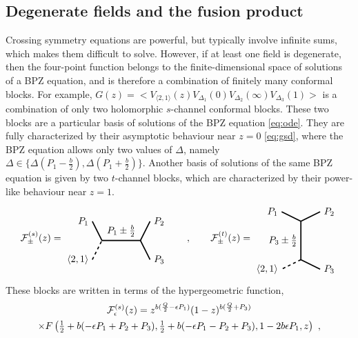 \documentclass[12pt, a4paper]{article}
\theoremstyle{break}
\begin{document}
\subsection{Degenerate fields and the fusion product}\label{sec:dffp}

Crossing symmetry equations are powerful, but typically involve infinite sums, which makes them difficult to solve.
However, if at least one field is degenerate, then the four-point function belongs to the finite-dimensional space of solutions of a BPZ equation, and is therefore a combination of finitely many conformal blocks. 
For example,
$G(z)=\Big< V_{\langle 2, 1 \rangle}(z) V_{\Delta_1}(0)V_{\Delta_2}(\infty)V_{\Delta_3}(1) \Big>$ is a combination of only two holomorphic $s$-channel conformal blocks.
These two blocks are a particular basis of solutions of the BPZ equation \eqref{eq:ode}.
They are fully characterized by their asymptotic behaviour near $z=0$ \eqref{eq:gsd}, where the BPZ equation allows only two values of $\Delta$, namely $\Delta\in\{\Delta(P_1-\frac{b}{2}),\Delta(P_1+\frac{b}{2})\}$.
Another basis of solutions of the same BPZ equation is given by two $t$-channel blocks, which are characterized by their power-like behaviour near $z=1$.
\begin{align}
 \mathcal{F}^{(s)}_\pm(z)  =  
 \begin{tikzpicture}[baseline=(current  bounding  box.center), very thick, scale = .35]
\draw (-1,2) node [left] {$P_1$} -- (0,0) -- node [above] {$P_1\pm \frac{b}{2}$} (4,0) -- (5,2) node [right] {$P_2$};
\draw[dashed] (-1,-2) node [left] {$\langle 2,1 \rangle$} -- (0,0);
\draw (4,0) -- (5,-2) node [right] {$P_3$};
\end{tikzpicture}
\qquad , \qquad 
\mathcal{F}^{(t)}_\pm(z)  =  
 \begin{tikzpicture}[baseline=(current  bounding  box.center), very thick, scale = .35]
 \draw (-2,3) node [left] {$P_1$} -- (0,2) -- node [left] {$P_3\pm \frac{b}{2}$} (0,-2);
 \draw[dashed] (0, -2) -- (-2, -3) node [left] {$\langle 2,1 \rangle$};
\draw (0,2) -- (2,3) node [right] {$P_2$};
\draw (0,-2) -- (2, -3) node [right] {$P_3$};
\end{tikzpicture}
\label{gpic}
\end{align}
These blocks are written in terms of the hypergeometric function,
\begin{multline}
\renewcommand{\arraystretch}{1.3}
 \mathcal{F}^{(s)}_\epsilon(z) = z^{b(\frac{Q}{2}-\epsilon P_1)} (1-z)^{b(\frac{Q}{2}+P_3)} 
 \\
 \times F\left(\tfrac12 + b(-\epsilon P_1+P_2+P_3), \tfrac12 + b(-\epsilon P_1-P_2+P_3), 1 - 2b\epsilon P_1, z\right)\ ,
\label{gpm}
\end{multline}
\end{document}
